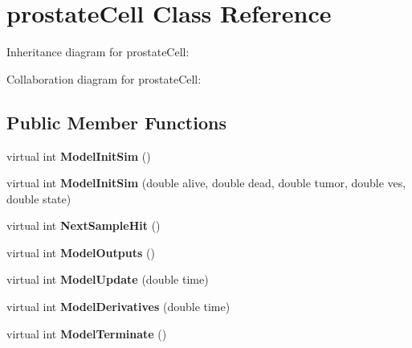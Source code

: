 \hypertarget{classprostateCell}{}\section{prostate\+Cell Class Reference}
\label{classprostateCell}


Inheritance diagram for prostate\+Cell\+:


Collaboration diagram for prostate\+Cell\+:
\subsection*{Public Member Functions}
\begin{DoxyCompactItemize}
\item 
virtual int {\bfseries Model\+Init\+Sim} ()\hypertarget{classprostateCell_adffef440e86b52802dc19176f4e05e1d}{}\label{classprostateCell_adffef440e86b52802dc19176f4e05e1d}

\item 
virtual int {\bfseries Model\+Init\+Sim} (double alive, double dead, double tumor, double ves, double state)\hypertarget{classprostateCell_a5d0dd466f979bd2c8f1ee61815d25c1c}{}\label{classprostateCell_a5d0dd466f979bd2c8f1ee61815d25c1c}

\item 
virtual int {\bfseries Next\+Sample\+Hit} ()\hypertarget{classprostateCell_aaab5ae9569e95cb6c519bae3b8ace4ca}{}\label{classprostateCell_aaab5ae9569e95cb6c519bae3b8ace4ca}

\item 
virtual int {\bfseries Model\+Outputs} ()\hypertarget{classprostateCell_a95f944bcef58a9b2acbbfb947992ffea}{}\label{classprostateCell_a95f944bcef58a9b2acbbfb947992ffea}

\item 
virtual int {\bfseries Model\+Update} (double time)\hypertarget{classprostateCell_a88f302798b59818e6213b5ed20d1553a}{}\label{classprostateCell_a88f302798b59818e6213b5ed20d1553a}

\item 
virtual int {\bfseries Model\+Derivatives} (double time)\hypertarget{classprostateCell_aa61c760165a94a6c13f69004b7e63440}{}\label{classprostateCell_aa61c760165a94a6c13f69004b7e63440}

\item 
virtual int {\bfseries Model\+Terminate} ()\hypertarget{classprostateCell_ad46ce9655a68921b56d61eb9c9f8016b}{}\label{classprostateCell_ad46ce9655a68921b56d61eb9c9f8016b}


\end{DoxyCompactItemize}
